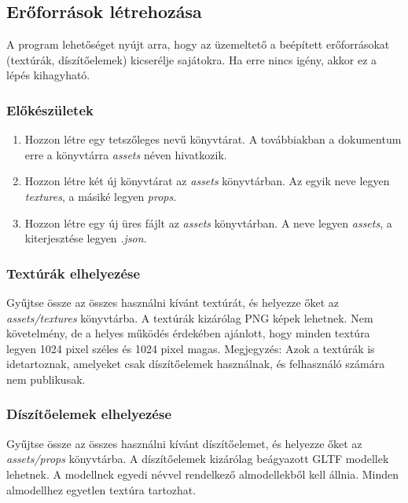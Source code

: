\subsection{Erőforrások létrehozása}
\label{kleng}

A program lehetőséget nyújt arra, hogy az üzemeltető a beépített erőforrásokat
(textúrák, díszítőelemek) kicserélje sajátokra. Ha erre nincs igény, akkor ez a lépés kihagyható.

\subsubsection{Előkészületek}

\begin{enumerate}
    \item Hozzon létre egy tetszőleges nevű könyvtárat. A továbbiakban a dokumentum erre a
          könyvtárra \emph{assets} néven hivatkozik.

    \item Hozzon létre két új könyvtárat az \emph{assets} könyvtárban. Az egyik neve legyen
          \emph{textures}, a másiké legyen \emph{props}.

    \item Hozzon létre egy új üres fájlt az \emph{assets} könyvtárban. A neve legyen \emph{assets},
          a kiterjesztése legyen \emph{.json}.
\end{enumerate}

\subsubsection{Textúrák elhelyezése}

Gyűjtse össze az összes használni kívánt textúrát, és helyezze őket az \emph{assets/textures}
könyvtárba. A textúrák kizárólag PNG képek lehetnek. Nem követelmény, de a helyes működés érdekében
ajánlott, hogy minden textúra legyen 1024 pixel széles és 1024 pixel magas. Megjegyzés: Azok a
textúrák is idetartoznak, amelyeket csak díszítőelemek használnak, és felhasználó számára nem
publikusak.

\subsubsection{Díszítőelemek elhelyezése}

Gyűjtse össze az összes használni kívánt díszítőelemet, és helyezze őket az \emph{assets/props}
könyvtárba. A díszítőelemek kizárólag beágyazott GLTF modellek lehetnek. A modellnek egyedi
névvel rendelkező almodellekből kell állnia. Minden almodellhez egyetlen textúra tartozhat.


